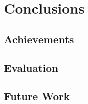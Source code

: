 \documentclass{report}
\begin{document}
\chapter{Conclusions} \label{Conclusions}  %

\section{Achievements} \label{Achievements}

\section{Evaluation} \label{Evaluation}




\section{Future Work} \label{Future Work}
\end{document}
